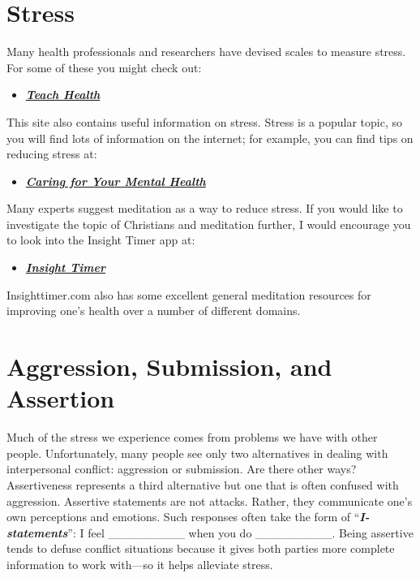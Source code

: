 \documentclass[
]{book}
\providecommand{\tightlist}{%
  \setlength{\itemsep}{0pt}\setlength{\parskip}{0pt}}
\begin{document}
\hypertarget{stress}{%
\section{Stress}\label{stress}}

Many health professionals and researchers have devised scales to measure stress. For some of these you might check out:

\begin{itemize}
\tightlist
\item
  \href{http://www.teachhealth.com/\#stressscale}{\textbf{\emph{Teach Health}}}
\end{itemize}

This site also contains useful information on stress. Stress is a popular topic, so you will find lots of information on the internet; for example, you can find tips on reducing stress at:

\begin{itemize}
\tightlist
\item
  \href{https://www.nimh.nih.gov/health/topics/caring-for-your-mental-health}{\textbf{\emph{Caring for Your Mental Health}}}
\end{itemize}

Many experts suggest meditation as a way to reduce stress. If you would like to investigate the topic of Christians and meditation further, I would encourage you to look into the Insight Timer app at:

\begin{itemize}
\tightlist
\item
  \href{https://insighttimer.com/meditation-topics/christianity}{\textbf{\emph{Insight Timer}}}
\end{itemize}

Insighttimer.com also has some excellent general meditation resources for improving one's health over a number of different domains.

\hypertarget{aggression-submission-and-assertion}{%
\section{Aggression, Submission, and Assertion}\label{aggression-submission-and-assertion}}

Much of the stress we experience comes from problems we have with other people. Unfortunately, many people see only two alternatives in dealing with interpersonal conflict: aggression or submission. Are there other ways?
Assertiveness represents a third alternative but one that is often confused with aggression. Assertive statements are not attacks. Rather, they communicate one's own perceptions and emotions. Such responses often take the form of ``\textbf{\emph{I-statements}}'': I feel \_\_\_\_\_\_\_\_\_ when you do \_\_\_\_\_\_\_\_\_. Being assertive tends to defuse conflict situations because it gives both parties more complete information to work with---so it helps alleviate stress.
\end{document}
